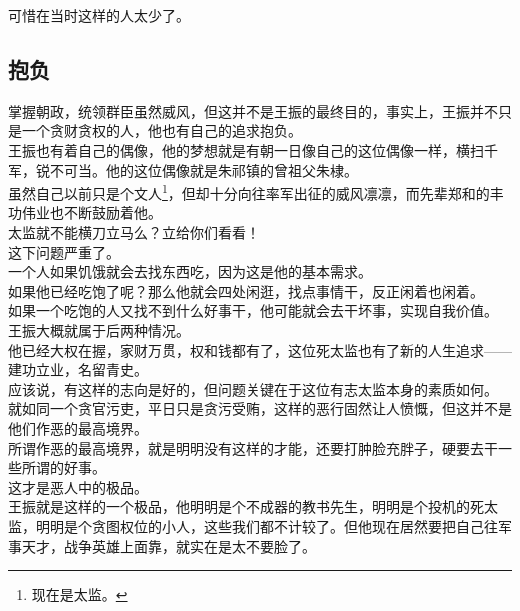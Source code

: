 \begin{multicols}{\theparacolNo}
可惜在当时这样的人太少了。\\

\subsection{抱负}
掌握朝政，统领群臣虽然威风，但这并不是王振的最终目的，事实上，王振并不只是一个贪财贪权的人，他也有自己的追求抱负。\\

王振也有着自己的偶像，他的梦想就是有朝一日像自己的这位偶像一样，横扫千军，锐不可当。他的这位偶像就是朱祁镇的曾祖父朱棣。\\

虽然自己以前只是个文人\footnote{现在是太监。}，但却十分向往率军出征的威风凛凛，而先辈郑和的丰功伟业也不断鼓励着他。\\

太监就不能横刀立马么？立给你们看看！\\

这下问题严重了。\\

一个人如果饥饿就会去找东西吃，因为这是他的基本需求。\\

如果他已经吃饱了呢？那么他就会四处闲逛，找点事情干，反正闲着也闲着。\\

如果一个吃饱的人又找不到什么好事干，他可能就会去干坏事，实现自我价值。\\

王振大概就属于后两种情况。\\

他已经大权在握，家财万贯，权和钱都有了，这位死太监也有了新的人生追求——建功立业，名留青史。\\

应该说，有这样的志向是好的，但问题关键在于这位有志太监本身的素质如何。\\

就如同一个贪官污吏，平日只是贪污受贿，这样的恶行固然让人愤慨，但这并不是他们作恶的最高境界。\\

所谓作恶的最高境界，就是明明没有这样的才能，还要打肿脸充胖子，硬要去干一些所谓的好事。\\

这才是恶人中的极品。\\

王振就是这样的一个极品，他明明是个不成器的教书先生，明明是个投机的死太监，明明是个贪图权位的小人，这些我们都不计较了。但他现在居然要把自己往军事天才，战争英雄上面靠，就实在是太不要脸了。\\


\end{multicols}
